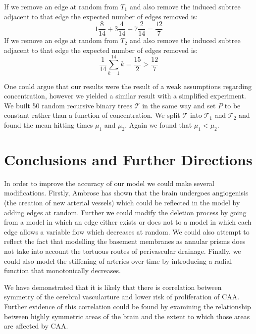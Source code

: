 \documentclass[12pt]{article} %
\theoremstyle{definition}
\begin{document}
If we remove an edge at random from $T_{1}$ and also remove the  induced subtree adjacent to that edge the expected number of edges removed is:
\begin{equation}
1\frac{8}{14} + 3\frac{4}{14} + 7\frac{2}{14} = \frac{12}{7} 
\end{equation} 
If we remove an edge at random from $T_{2}$ and also remove the  induced subtree adjacent to that edge the expected number of edges removed is:
\begin{equation}
\frac{1}{14}\sum_{k=1}^{14}k = \frac{15}{2} > \frac{12}{7}
\end{equation}

One could argue that our results were the result of a weak assumptions regarding concentration, however we yielded a similar result with a simplified experiment.  We built 50 random recursive binary trees $\mathcal{T}$ in the same way and set $P$ to be constant rather than a function of concentration.  We split $\mathcal{T}$ into $\mathcal{T}_{1}$ and $\mathcal{T}_{2}$ and found the mean hitting times $\mu_{1}$ and $\mu_{2}$.  Again we found that $\mu_{1} < \mu_{2}$.  

\section{Conclusions and Further Directions}
In order to improve the accuracy of our model we could make several modifications.  Firstly, Ambrose has shown that the brain undergoes angiogenisis  (the creation of new arterial vessels) which could be reflected in the model by adding edges at random.  Further we could modify the deletion process by going from a model in which an edge either exists or does not to a model in which each edge allows a variable flow which decreases at random.  We could also attempt to reflect the fact that modelling the basement membranes as annular prisms does not take into account the tortuous routes of perivascular drainage.  Finally, we could also model the stiffening of arteries over time  by introducing a radial function that monotonically decreases.

We have demonstrated that it is likely that there is correlation between symmetry of the cerebral vascularture and lower risk of proliferation of CAA.  Further evidence of this correlation could be found by examining the relationship between highly symmetric areas of the brain and the extent to which those areas are affected by CAA.  


%


\end{document}
